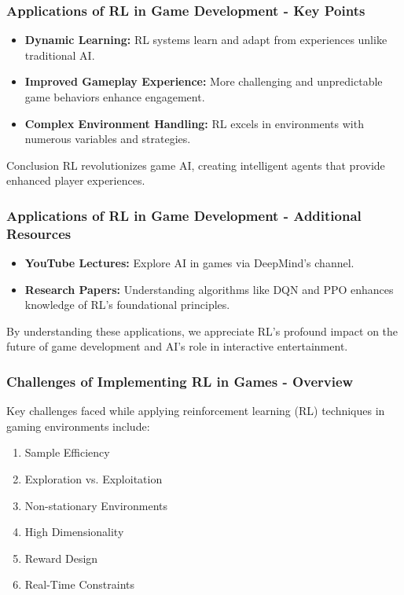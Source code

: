 \documentclass[aspectratio=169]{beamer}
\begin{document}
\begin{frame}[fragile]
    \frametitle{Applications of RL in Game Development - Key Points}
    \begin{itemize}
        \item \textbf{Dynamic Learning:} RL systems learn and adapt from experiences unlike traditional AI.
        \item \textbf{Improved Gameplay Experience:} More challenging and unpredictable game behaviors enhance engagement.
        \item \textbf{Complex Environment Handling:} RL excels in environments with numerous variables and strategies.
    \end{itemize}
    \begin{block}{Conclusion}
        RL revolutionizes game AI, creating intelligent agents that provide enhanced player experiences.
    \end{block}
\end{frame}

\begin{frame}[fragile]
    \frametitle{Applications of RL in Game Development - Additional Resources}
    \begin{itemize}
        \item \textbf{YouTube Lectures:} Explore AI in games via DeepMind's channel.
        \item \textbf{Research Papers:} Understanding algorithms like DQN and PPO enhances knowledge of RL's foundational principles.
    \end{itemize}

    By understanding these applications, we appreciate RL’s profound impact on the future of game development and AI's role in interactive entertainment.
\end{frame}

\begin{frame}[fragile]
    \frametitle{Challenges of Implementing RL in Games - Overview}
    Key challenges faced while applying reinforcement learning (RL) techniques in gaming environments include:
    \begin{enumerate}
        \item Sample Efficiency
        \item Exploration vs. Exploitation
        \item Non-stationary Environments
        \item High Dimensionality
        \item Reward Design
        \item Real-Time Constraints
    \end{enumerate}
\end{frame}
\end{document}

